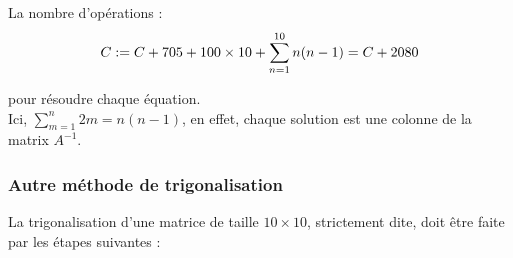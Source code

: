 \documentclass{article}
\begin{document}
\begin{tcolorbox}[title={Conclusion}, fonttitle = \bfseries \sffamily]
    La nombre d'opérations :
        \[
        C := C + 705+100\times10+\sum_{n=1}^{10}n(n-1)\\ = C + 2080
        \]
\end{tcolorbox}
pour résoudre chaque équation.\\

Ici, $\sum_{m=1}^{n}2m=n(n-1)$, en effet, chaque solution est une colonne de la matrix $A^{-1}$.


\subsubsection{Autre méthode de trigonalisation}

La trigonalisation d'une matrice de taille $10 \times 10$, strictement dite, doit être faite par les étapes suivantes :
\end{document}
